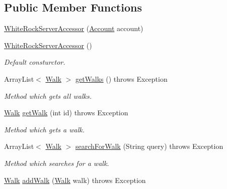 \subsection*{Public Member Functions}
\begin{DoxyCompactItemize}
\item 
\hyperlink{classuk_1_1ac_1_1swan_1_1digitaltrails_1_1sync_1_1_white_rock_server_accessor_a8eead67f91e0513d71e0f5597387c558}{White\+Rock\+Server\+Accessor} (\hyperlink{classuk_1_1ac_1_1swan_1_1digitaltrails_1_1components_1_1_account}{Account} account)
\item 
\hyperlink{classuk_1_1ac_1_1swan_1_1digitaltrails_1_1sync_1_1_white_rock_server_accessor_a075564cd65915ba99e5954324414c2a4}{White\+Rock\+Server\+Accessor} ()
\begin{DoxyCompactList}\small\item\em Default consturctor. \end{DoxyCompactList}\item 
Array\+List$<$ \hyperlink{classuk_1_1ac_1_1swan_1_1digitaltrails_1_1components_1_1_walk}{Walk} $>$ \hyperlink{classuk_1_1ac_1_1swan_1_1digitaltrails_1_1sync_1_1_white_rock_server_accessor_a85f7e2ab2b091c0eaae18852b7f2a77b}{get\+Walks} ()  throws Exception 
\begin{DoxyCompactList}\small\item\em Method which gets all walks. \end{DoxyCompactList}\item 
\hyperlink{classuk_1_1ac_1_1swan_1_1digitaltrails_1_1components_1_1_walk}{Walk} \hyperlink{classuk_1_1ac_1_1swan_1_1digitaltrails_1_1sync_1_1_white_rock_server_accessor_a90970621c8bc1cb33a480653552056e8}{get\+Walk} (int id)  throws Exception 
\begin{DoxyCompactList}\small\item\em Method which gets a walk. \end{DoxyCompactList}\item 
Array\+List$<$ \hyperlink{classuk_1_1ac_1_1swan_1_1digitaltrails_1_1components_1_1_walk}{Walk} $>$ \hyperlink{classuk_1_1ac_1_1swan_1_1digitaltrails_1_1sync_1_1_white_rock_server_accessor_a5dd9fccd110520c95edaa21bc17b90b3}{search\+For\+Walk} (String query)  throws Exception 
\begin{DoxyCompactList}\small\item\em Method which searches for a walk. \end{DoxyCompactList}\item 
\hyperlink{classuk_1_1ac_1_1swan_1_1digitaltrails_1_1components_1_1_walk}{Walk} \hyperlink{classuk_1_1ac_1_1swan_1_1digitaltrails_1_1sync_1_1_white_rock_server_accessor_a1295558ae97a6f0109e836f6b3c63003}{add\+Walk} (\hyperlink{classuk_1_1ac_1_1swan_1_1digitaltrails_1_1components_1_1_walk}{Walk} walk)  throws Exception 

\end{DoxyCompactItemize}
